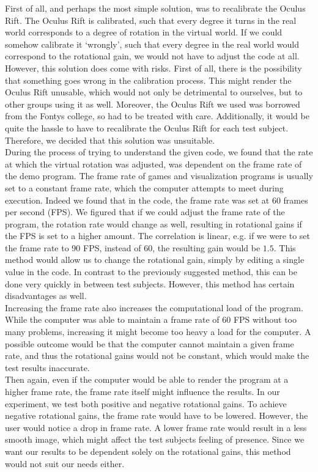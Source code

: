 First of all, and perhaps the most simple solution, was to recalibrate the Oculus Rift.
The Oculus Rift is calibrated, such that every degree it turns in the real world corresponds to a degree of rotation in the virtual world.
If we could somehow calibrate it `wrongly', such that every degree in the real world would correspond to the rotational gain, we would not have to adjust the code at all.
However, this solution does come with risks.
First of all, there is the possibility that something goes wrong in the calibration process.
This might render the Oculus Rift unusable, which would not only be detrimental to ourselves, but to other groups using it as well.
Moreover, the Oculus Rift we used was borrowed from the Fontys college, so had to be treated with care.
Additionally, it would be quite the hassle to have to recalibrate the Oculus Rift for each test subject.
Therefore, we decided that this solution was unsuitable.\\

During the process of trying to understand the given code, we found that the rate at which the virtual rotation was adjusted, was dependent on the frame rate of the demo program.
The frame rate of games and visualization programs is usually set to a constant frame rate, which the computer attempts to meet during execution.
Indeed we found that in the code, the frame rate was set at 60 frames per second (FPS).
We figured that if we could adjust the frame rate of the program, the rotation rate would change as well, resulting in rotational gains if the FPS is set to a higher amount.
The correlation is linear, e.g. if we were to set the frame rate to 90 FPS, instead of 60, the resulting gain would be $1.5$.
This method would allow us to change the rotational gain, simply by editing a single value in the code.
In contrast to the previously suggested method, this can be done very quickly in between test subjects.
However, this method has certain disadvantages as well. \\
Increasing the frame rate also increases the computational load of the program.
While the computer was able to maintain a frame rate of 60 FPS without too many problems, increasing it might become too heavy a load for the computer.
A possible outcome would be that the computer cannot maintain a given frame rate, and thus the rotational gains would not be constant, which would make the test results inaccurate. \\
Then again, even if the computer would be able to render the program at a higher frame rate, the frame rate itself might influence the results.
In our experiment, we test both positive and negative rotational gains.
To achieve negative rotational gains, the frame rate would have to be lowered.
However, the user would notice a drop in frame rate.
A lower frame rate would result in a less smooth image, which might affect the test subjects feeling of presence.
Since we want our results to be dependent solely on the rotational gains, this method would not suit our needs either. \\

